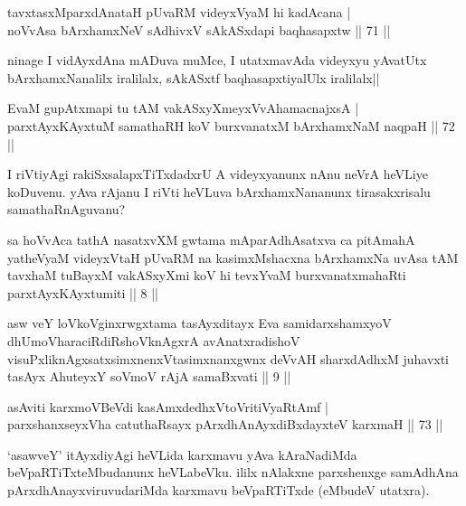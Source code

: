 \begin{shl}
tavxtasxMparxdAnataH pUvaRM videyxVyaM hi kadAcana | \\
noVvAsa bArxhamxNeV sAdhivxV sAkASxdapi baqhasapxtw \hfill|| 71 || 
\end{shl}

\begin{artha}
ninage I vidAyxdAna mADuva muMce, I utatxmavAda videyxyu yAvatUtx 
bArxhamxNanalilx iralilalx, sAkASxtf baqhasapxtiyalUlx iralilalx||
\end{artha}

\begin{shl}
EvaM gupAtxmapi tu tAM vakASxyXmeyxVvAhamacnajxsA | \\
parxtAyxKAyxtuM samathaRH koV burxvanatxM bArxhamxNaM naqpaH \hfill|| 72 || 
\end{shl}

\begin{artha}
I riVtiyAgi rakiSxsalapxTiTxdadxrU A videyxyanunx nAnu neVrA heVLiye 
koDuvenu. yAva rAjanu I riVti heVLuva bArxhamxNananunx tirasakxrisalu 
samathaRnAguvanu?
\end{artha}


\begin{shl}
sa hoVvAca tathA nasatxvXM gwtama mAparAdhAsatxva ca pitAmahA yatheVyaM videyxVtaH pUvaRM na kasimxMshacxna bArxhamxNa uvAsa tAM tavxhaM tuBayxM vakASxyXmi koV hi tevxYvaM burxvanatxmahaRti parxtAyxKAyxtumiti || 8 ||
\end{shl}

\begin{shl}
asw veY loVkoV\s ginxrwgxtama tasAyxditayx Eva samidarxshamxyoV dhUmoV\s haraciRdiRshoV\s knAgxrA avAnatxradishoV visuPxliknAgxsatxsimxnenxVtasimxnanxgwnx deVvAH sharxdAdhxM juhavxti tasAyx AhuteyxY soVmoV rAjA samaBxvati || 9 ||
\end{shl}


\begin{shl}
asAviti karxmoV\s BeVdi kasAmxdedhxVtoVritiVyaRtAmf | \\
parxshanxseyxVha catuthaRsayx pArxdhAnAyxdiBxdayxteV karxmaH \hfill|| 73 || 
\end{shl}

\begin{artha}
`asawveY' itAyxdiyAgi heVLida karxmavu yAva kAraNadiMda beVpaRTiTxteMbudanunx heVLabeVku. ililx nAlakxne parxshenxge samAdhAna pArxdhAnayxviruvudariMda karxmavu beVpaRTiTxde (eMbudeV utatxra).
\end{artha}

